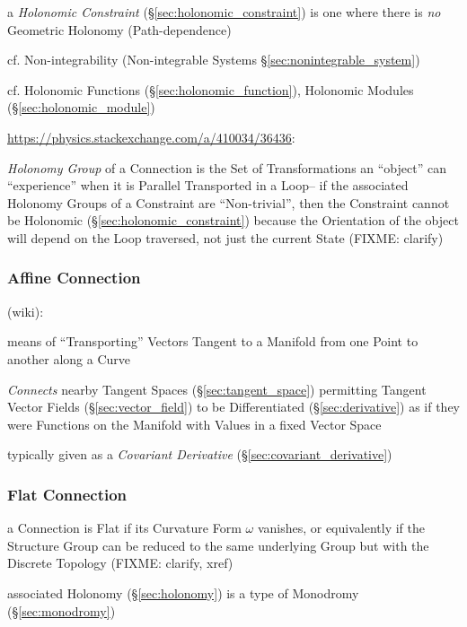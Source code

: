 \begin{itemize}
a \emph{Holonomic Constraint} (\S\ref{sec:holonomic_constraint}) is one where
there is \emph{no} Geometric Holonomy (Path-dependence)

cf. Non-integrability (Non-integrable Systems \S\ref{sec:nonintegrable_system})

\fist cf. Holonomic Functions (\S\ref{sec:holonomic_function}), Holonomic
Modules (\S\ref{sec:holonomic_module})

\url{https://physics.stackexchange.com/a/410034/36436}:

\emph{Holonomy Group} of a Connection is the Set of Transformations an
``object'' can ``experience'' when it is Parallel Transported in a Loop-- if
the associated Holonomy Groups of a Constraint are ``Non-trivial'', then the
Constraint cannot be Holonomic (\S\ref{sec:holonomic_constraint}) because the
Orientation of the object will depend on the Loop traversed, not just the
current State (FIXME: clarify)



\subsubsection{Affine Connection}\label{sec:affine_connection}

(wiki):

means of ``Transporting'' Vectors Tangent to a Manifold from one Point to
another along a Curve

\emph{Connects} nearby Tangent Spaces (\S\ref{sec:tangent_space}) permitting
Tangent Vector Fields (\S\ref{sec:vector_field}) to be Differentiated
(\S\ref{sec:derivative}) as if they were Functions on the Manifold with Values
in a fixed Vector Space

typically given as a \emph{Covariant Derivative}
(\S\ref{sec:covariant_derivative})



\subsubsection{Flat Connection}\label{sec:flat_connection}

a Connection is Flat if its Curvature Form $\omega$ vanishes, or equivalently
if the Structure Group can be reduced to the same underlying Group but with the
Discrete Topology (FIXME: clarify, xref)

associated Holonomy (\S\ref{sec:holonomy}) is a type of Monodromy
(\S\ref{sec:monodromy})




\end{itemize}
